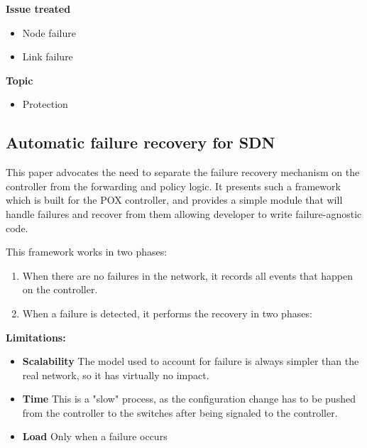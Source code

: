 \documentclass[compsoc]{IEEEtran}
\begin{document}
\textbf{Issue treated}
\begin{itemize}
	\item Node failure
	\item Link failure
\end{itemize}

\textbf{Topic}
\begin{itemize}
	\item Protection
\end{itemize}

\subsection{Automatic failure recovery for SDN \cite{Kuzniar:2013:AFR:2491185.2491218}}
This paper advocates the need to separate the failure recovery mechanism on the controller from the forwarding and policy logic. It presents such a framework which is built for the POX controller, and provides a simple module that will handle failures and recover from them allowing developer to write failure-agnostic code.

This framework works in two phases:
\begin{enumerate}
	\item When there are no failures in the network, it records all events that happen on the controller.
	\item When a failure is detected, it performs the recovery in two phases:
\end{enumerate}

\textbf{Limitations:}
\begin{itemize}
	\item \textbf{Scalability} The model used to account for failure is always simpler than the real network, so it has virtually no impact.
	\item \textbf{Time} This is a "slow" process, as the configuration change has to be pushed from the controller to the switches after being signaled to the controller.
	\item \textbf{Load} Only when a failure occurs
\end{itemize}
\end{document}
